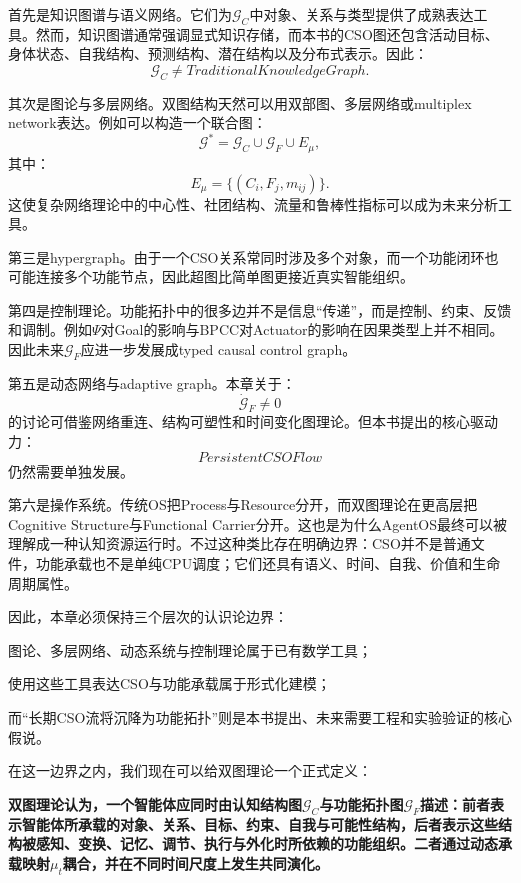 首先是知识图谱与语义网络。它们为$\mathcal G_C$中对象、关系与类型提供了成熟表达工具。然而，知识图谱通常强调显式知识存储，而本书的CSO图还包含活动目标、身体状态、自我结构、预测结构、潜在结构以及分布式表示。因此：
\[
\mathcal G_C
\neq
TraditionalKnowledgeGraph.
\]

其次是图论与多层网络。双图结构天然可以用双部图、多层网络或multiplex network表达。例如可以构造一个联合图：
\[
\mathcal G^\ast
=
\mathcal G_C
\cup
\mathcal G_F
\cup
E_\mu,
\]
其中：
\[
E_\mu
=
\{
(C_i,F_j,m_{ij})
\}.
\]
这使复杂网络理论中的中心性、社团结构、流量和鲁棒性指标可以成为未来分析工具。

第三是hypergraph。由于一个CSO关系常同时涉及多个对象，而一个功能闭环也可能连接多个功能节点，因此超图比简单图更接近真实智能组织。

第四是控制理论。功能拓扑中的很多边并不是信息“传递”，而是控制、约束、反馈和调制。例如$\Psi$对Goal的影响与BPCC对Actuator的影响在因果类型上并不相同。因此未来$\mathcal G_F$应进一步发展成typed causal control graph。

第五是动态网络与adaptive graph。本章关于：
\[
\dot{\mathcal G}_F\neq0
\]
的讨论可借鉴网络重连、结构可塑性和时间变化图理论。但本书提出的核心驱动力：
\[
PersistentCSOFlow
\]
仍然需要单独发展。

第六是操作系统。传统OS把Process与Resource分开，而双图理论在更高层把Cognitive Structure与Functional Carrier分开。这也是为什么AgentOS最终可以被理解成一种认知资源运行时。不过这种类比存在明确边界：CSO并不是普通文件，功能承载也不是单纯CPU调度；它们还具有语义、时间、自我、价值和生命周期属性。

因此，本章必须保持三个层次的认识论边界：
\begin{statementbox}
\centering
{}
\end{statementbox}

图论、多层网络、动态系统与控制理论属于已有数学工具；

使用这些工具表达CSO与功能承载属于形式化建模；

而“长期CSO流将沉降为功能拓扑”则是本书提出、未来需要工程和实验验证的核心假说。

在这一边界之内，我们现在可以给双图理论一个正式定义：

\begin{definition*}
\bfseries
双图理论认为，一个智能体应同时由认知结构图$\mathcal G_C$与功能拓扑图$\mathcal G_F$描述：前者表示智能体所承载的对象、关系、目标、约束、自我与可能性结构，后者表示这些结构被感知、变换、记忆、调节、执行与外化时所依赖的功能组织。二者通过动态承载映射$\mu_t$耦合，并在不同时间尺度上发生共同演化。
\end{definition*}

